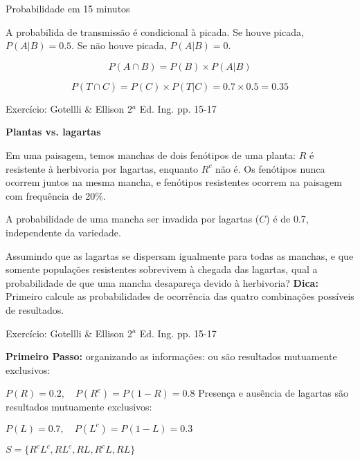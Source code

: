 \documentclass{beamer}\usepackage[]{graphicx}\usepackage[]{color}
\begin{document}
\begin{frame}{Probabilidade em 15 minutos}

A probabilida de transmissão é condicional à picada. Se houve picada, $P(A | B) = 0.5$. Se não houve picada, $P(A | B) = 0$.

 
 \begin{equation*}
     P(A \cap B) = P(B) \times P(A | B) 
 \end{equation*}
 
  \begin{equation*}
     P(T \cap C) = P(C) \times P(T | C) = 0.7 \times 0.5 = 0.35
 \end{equation*}
 

\end{frame} 

\begin{frame}{Exercício: Gotellli \& Ellison 2$^a$ Ed. Ing. pp. 15-17}

\textbf{Plantas vs. lagartas}

\begin{small}

Em uma paisagem, temos manchas de dois fenótipos de uma planta: $R$ é resistente à herbivoria por lagartas, enquanto $R^c$ não é. Os fenótipos nunca ocorrem juntos na mesma mancha, e fenótipos resistentes ocorrem na paisagem com frequência  de 20$\%$.

A probabilidade de uma mancha ser invadida por lagartas ($C$) é de 0.7, independente da variedade.
\vfill

Assumindo que as lagartas se dispersam igualmente para todas as manchas, e que somente populações resistentes sobrevivem à chegada das lagartas, qual a probabilidade de que uma mancha desapareça devido à herbivoria? 
\vfill
\alert{\textbf{Dica:}} Primeiro calcule as probabilidades de ocorrência das quatro combinações possíveis de resultados.

\end{small}

\end{frame}

\begin{frame}{Exercício: Gotellli \& Ellison 2$^a$ Ed. Ing. pp. 15-17}

\textbf{Primeiro Passo:} organizando as informações:
\vfill
{} ou  são resultados mutuamente exclusivos:

$P(R) = 0.2, \quad P(R^c) = P(1 - R) = 0.8$
\vfill
Presença e ausência de lagartas são resultados mutuamente exclusivos:

$P(L) = 0.7, \quad P(L^c) = P(1 - L) = 0.3$

\vfill
$S = \{R^cL^c,RL^c,RL,R^cL,RL\}$

\end{frame}
\end{document}

